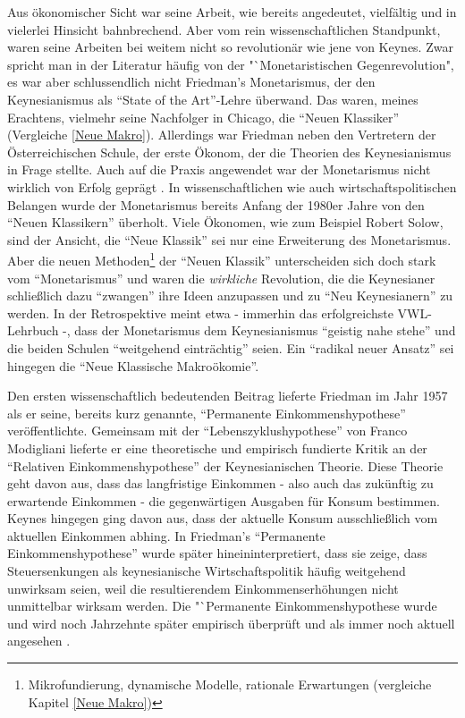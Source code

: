 Aus ökonomischer Sicht war seine Arbeit, wie bereits angedeutet, vielfältig und in vielerlei Hinsicht bahnbrechend. Aber vom rein wissenschaftlichen Standpunkt, waren seine Arbeiten bei weitem nicht so revolutionär wie jene von Keynes. Zwar spricht man in der Literatur häufig von der "`Monetaristischen Gegenrevolution", es war aber schlussendlich nicht Friedman's Monetarismus, der den Keynesianismus als "`State of the Art"'-Lehre überwand. Das waren, meines Erachtens, vielmehr seine Nachfolger in Chicago, die "`Neuen Klassiker"' (Vergleiche \ref{Neue Makro}). Allerdings war Friedman neben den Vertretern der Österreichischen Schule, der erste Ökonom, der die Theorien des Keynesianismus in Frage stellte.
Auch auf die Praxis angewendet war der Monetarismus nicht wirklich von Erfolg geprägt \parencite[S. 709]{Samuelson1998}. In wissenschaftlichen wie auch wirtschaftspolitischen Belangen wurde der Monetarismus bereits Anfang der 1980er Jahre von den "`Neuen Klassikern"' überholt. Viele Ökonomen, wie zum Beispiel Robert Solow, sind der Ansicht, die "`Neue Klassik"' sei nur eine Erweiterung des Monetarismus\parencite[S.342]{Warsh}. Aber die neuen Methoden\footnote{Mikrofundierung, dynamische Modelle, rationale Erwartungen (vergleiche Kapitel \ref{Neue Makro})} der "`Neuen Klassik"' unterscheiden sich doch stark vom "`Monetarismus"' und waren die \textit{wirkliche} Revolution, die die Keynesianer schließlich dazu "`zwangen"' ihre Ideen anzupassen und zu "`Neu Keynesianern"' zu werden. In der Retrospektive meint etwa \textcite[S. 697]{Samuelson1998} - immerhin das erfolgreichste VWL-Lehrbuch -, dass der Monetarismus dem Keynesianismus "`geistig nahe stehe"' und die beiden Schulen "`weitgehend einträchtig"' \parencite[S. 702]{Samuelson1998} seien. Ein "`radikal neuer Ansatz"'\parencite[S. 704]{Samuelson1998} sei hingegen die "`Neue Klassische Makroökomie"'.

Den ersten wissenschaftlich bedeutenden Beitrag lieferte Friedman im Jahr 1957 \parencite{Friedman1957} als er seine, bereits kurz genannte, "`Permanente Einkommenshypothese"' veröffentlichte. Gemeinsam mit der "`Lebenszyklushypothese"' \parencite{Modigliani1954} von Franco Modigliani lieferte er eine theoretische und empirisch fundierte Kritik an der "`Relativen Einkommenshypothese"' der Keynesianischen Theorie. Diese Theorie geht davon aus, dass das langfristige Einkommen - also auch das zukünftig zu erwartende Einkommen - die gegenwärtigen Ausgaben für Konsum bestimmen. Keynes hingegen ging davon aus, dass der aktuelle Konsum ausschließlich vom aktuellen Einkommen abhing. In Friedman's "`Permanente Einkommenshypothese"' wurde später hineininterpretiert, dass sie zeige, dass Steuersenkungen als keynesianische Wirtschaftspolitik häufig weitgehend unwirksam seien, weil die resultierendem Einkommenserhöhungen nicht unmittelbar wirksam werden. Die "`Permanente Einkommenshypothese wurde und wird noch Jahrzehnte später empirisch überprüft und als immer noch aktuell angesehen \parencite{Bernanke1984, Mankiw1985}.  

